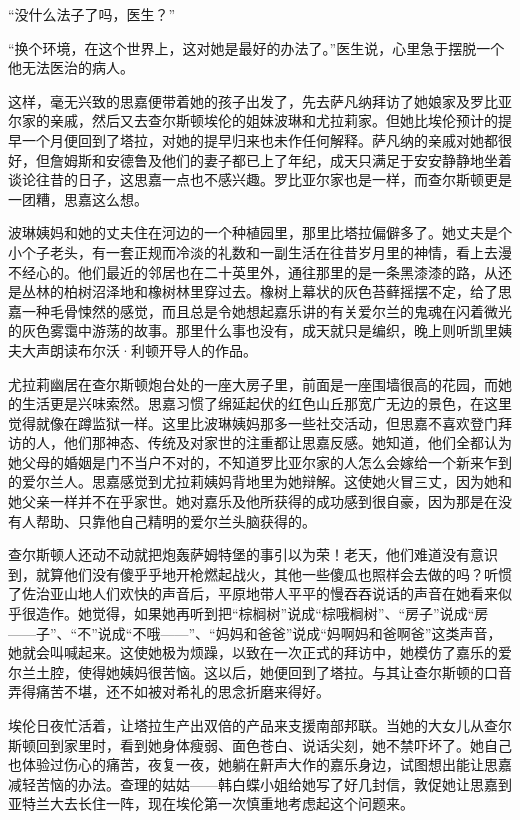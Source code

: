 \par “没什么法子了吗，医生？”
\par “换个环境，在这个世界上，这对她是最好的办法了。”医生说，心里急于摆脱一个他无法医治的病人。
\par 这样，毫无兴致的思嘉便带着她的孩子出发了，先去萨凡纳拜访了她娘家及罗比亚尔家的亲戚，然后又去查尔斯顿埃伦的姐妹波琳和尤拉莉家。但她比埃伦预计的提早一个月便回到了塔拉，对她的提早归来也未作任何解释。萨凡纳的亲戚对她都很好，但詹姆斯和安德鲁及他们的妻子都已上了年纪，成天只满足于安安静静地坐着谈论往昔的日子，这思嘉一点也不感兴趣。罗比亚尔家也是一样，而查尔斯顿更是一团糟，思嘉这么想。
\par 波琳姨妈和她的丈夫住在河边的一个种植园里，那里比塔拉偏僻多了。她丈夫是个小个子老头，有一套正规而冷淡的礼数和一副生活在往昔岁月里的神情，看上去漫不经心的。他们最近的邻居也在二十英里外，通往那里的是一条黑漆漆的路，从还是丛林的柏树沼泽地和橡树林里穿过去。橡树上幕状的灰色苔藓摇摆不定，给了思嘉一种毛骨悚然的感觉，而且总是令她想起嘉乐讲的有关爱尔兰的鬼魂在闪着微光的灰色雾霭中游荡的故事。那里什么事也没有，成天就只是编织，晚上则听凯里姨夫大声朗读布尔沃·利顿开导人的作品。
\par 尤拉莉幽居在查尔斯顿炮台处的一座大房子里，前面是一座围墙很高的花园，而她的生活更是兴味索然。思嘉习惯了绵延起伏的红色山丘那宽广无边的景色，在这里觉得就像在蹲监狱一样。这里比波琳姨妈那多一些社交活动，但思嘉不喜欢登门拜访的人，他们那神态、传统及对家世的注重都让思嘉反感。她知道，他们全都认为她父母的婚姻是门不当户不对的，不知道罗比亚尔家的人怎么会嫁给一个新来乍到的爱尔兰人。思嘉感觉到尤拉莉姨妈背地里为她辩解。这使她火冒三丈，因为她和她父亲一样并不在乎家世。她对嘉乐及他所获得的成功感到很自豪，因为那是在没有人帮助、只靠他自己精明的爱尔兰头脑获得的。
\par 查尔斯顿人还动不动就把炮轰萨姆特堡的事引以为荣！老天，他们难道没有意识到，就算他们没有傻乎乎地开枪燃起战火，其他一些傻瓜也照样会去做的吗？听惯了佐治亚山地人们欢快的声音后，平原地带人平平的慢吞吞说话的声音在她看来似乎很造作。她觉得，如果她再听到把“棕榈树”说成“棕哦榈树”、“房子”说成“房——子”、“不”说成“不哦——”、“妈妈和爸爸”说成“妈啊妈和爸啊爸”这类声音，她就会叫喊起来。这使她极为烦躁，以致在一次正式的拜访中，她模仿了嘉乐的爱尔兰土腔，使得她姨妈很苦恼。这以后，她便回到了塔拉。与其让查尔斯顿的口音弄得痛苦不堪，还不如被对希礼的思念折磨来得好。
\par 埃伦日夜忙活着，让塔拉生产出双倍的产品来支援南部邦联。当她的大女儿从查尔斯顿回到家里时，看到她身体瘦弱、面色苍白、说话尖刻，她不禁吓坏了。她自己也体验过伤心的痛苦，夜复一夜，她躺在鼾声大作的嘉乐身边，试图想出能让思嘉减轻苦恼的办法。查理的姑姑——韩白蝶小姐给她写了好几封信，敦促她让思嘉到亚特兰大去长住一阵，现在埃伦第一次慎重地考虑起这个问题来。

